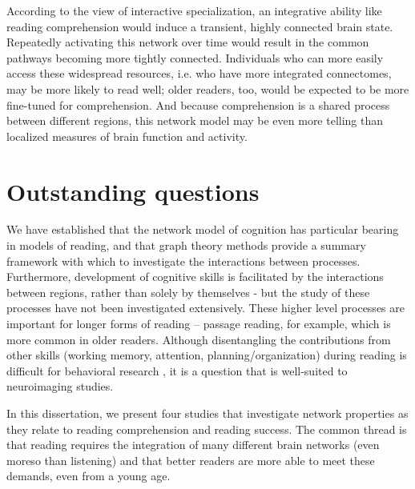 According to the view of interactive specialization, an integrative ability like reading comprehension would induce a transient, highly connected brain state. Repeatedly activating this network over time would result in the common pathways becoming more tightly connected. Individuals who can more easily access these widespread resources, i.e. who have more integrated connectomes, may be more likely to read well; older readers, too, would be expected to be more fine-tuned for comprehension. And because comprehension is a shared process between different regions, this network model may be even more telling than localized measures of brain function and activity. 


\section{Outstanding questions}

We have established that the network model of cognition has particular bearing in models of reading, and that graph theory methods provide a summary framework with which to investigate the interactions between processes. Furthermore, development of cognitive skills is facilitated by the interactions between regions, rather than solely by themselves - but the study of these processes have not been investigated extensively. These higher level processes are important for longer forms of reading -- passage reading, for example, which is more common in older readers. Although disentangling the contributions from other skills (working memory, attention, planning/organization) during reading is difficult for behavioral research \citep{Cain2006}, it is a question that is well-suited to neuroimaging studies. 

In this dissertation, we present four studies that investigate network properties as they relate to reading comprehension and reading success. The common thread is that reading requires the integration of many different brain networks (even moreso than listening) and that better readers are more able to meet these demands, even from a young age.

